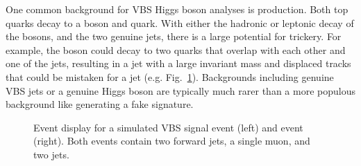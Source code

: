 One common background for VBS Higgs boson analyses is \ttbar production. 
Both top quarks decay to a \PW boson and \PQb quark. 
With either the hadronic or leptonic decay of the \PW bosons, and the two genuine \PQb jets, there is a large potential for trickery. 
For example, the \PW boson could decay to two quarks that overlap with each other and one of the \PQb jets, resulting in a jet with a large invariant mass and displaced tracks that could be mistaken for a \Htobb jet (e.g. Fig.~\ref{fig:vbs_vs_ttbar}). 
Backgrounds including genuine VBS jets or a genuine Higgs boson are typically much rarer than a more populous background like \ttbar generating a fake signature. 

\begin{figure}[htb]
    \centering
    \qquad
    \caption[Event display for a simulated VBS \WH signal and \ttbar event.]{
        Event display for a simulated VBS \WH signal event (left) and \ttbar event (right). 
        Both events contain two forward jets, a single muon, and two \PQb jets. 
    }
    \label{fig:vbs_vs_ttbar}
\end{figure}

